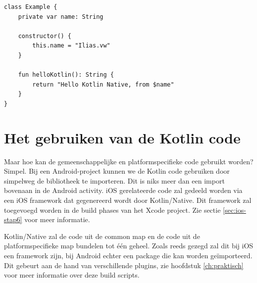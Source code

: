 \begin{lstlisting}
class Example {
	private var name: String
	
	constructor() {
		this.name = "Ilias.vw"
	}
	
	fun helloKotlin(): String {
		return "Hello Kotlin Native, from $name"
	}
}
\end{lstlisting}

\section {Het gebruiken van de Kotlin code}
\label{sec:use-ios-code}
Maar hoe kan de gemeenschappelijke en platformspecifieke code gebruikt worden? Simpel. Bij een Android-project kunnen we de Kotlin code gebruiken door simpelweg de bibliotheek te importeren. Dit is niks meer dan een import bovenaan in de Android activity. iOS gerelateerde code zal gedeeld worden via een iOS framework dat gegenereerd wordt door Kotlin/Native. Dit framework zal toegevoegd worden in de build phases van het Xcode project. Zie sectie \ref{sec:ios-stap6} voor meer informatie.

Kotlin/Native zal de code uit de common map en de code uit de platformspecifieke map bundelen tot één geheel. Zoals reeds gezegd zal dit bij iOS een framework zijn, bij Android echter een package die kan worden geïmporteerd. Dit gebeurt aan de hand van verschillende plugins, zie hoofdstuk \ref{ch:praktisch} voor meer informatie over deze build scripts.